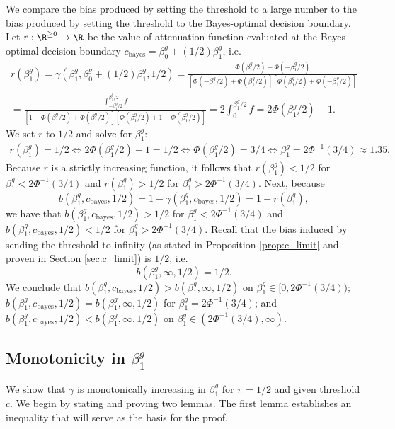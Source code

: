 \documentclass[11pt]{article}
\begin{document}
\begin{appendices}
\begin{refsection}
We compare the bias produced by setting the threshold to a large number to the bias produced by setting the threshold to the Bayes-optimal decision boundary. Let $r: \R^{\geq 0} \to \R$ be the value of attenuation function evaluated at the Bayes-optimal decision boundary $c_\textrm{bayes} = \beta^g_0 + (1/2) \beta^g_1$, i.e.
\begin{multline*}
r(\beta^g_1) = \gamma(\beta^g_1, \beta^g_0 + (1/2)\beta^g_1, 1/2) = \frac{\Phi(\beta^g_1/2) - \Phi(-\beta^g_1/2)}{\left[\Phi(-\beta^g_1/2) + \Phi( \beta^g_1/2) \right] \left[\Phi(\beta^g_1/2) + \Phi( -\beta^g_1/2)\right]} \\ = \frac{\int_{-\beta^g_1/2}^{\beta^g_1/2} f}{\left[ 1 - \Phi(\beta^g_1/2) + \Phi(\beta^g_1/2) \right]\left[ \Phi(\beta^g_1/2) + 1 - \Phi(\beta^g_1/2) \right]} = 2 \int_{0}^{\beta^g_1/2} f = 2 \Phi(\beta^g_1/2) - 1.
\end{multline*}
We set $r$ to $1/2$ and solve for $\beta^g_1$:
\begin{multline*}
r(\beta^g_1) = 1/2 \iff 2\Phi(\beta^g_1/2) -1 = 1/2 \iff \Phi(\beta^g_1/2) = 3/4 \iff \beta^g_1 = 2 \Phi^{-1}(3/4) \approx 1.35.
\end{multline*}
Because $r$ is a strictly increasing function, it follows that $r(\beta^g_1) < 1/2$ for $\beta^g_1 < 2\Phi^{-1}(3/4)$ and $r(\beta^g_1) > 1/2$ for $\beta^g_1 > 2\Phi^{-1}(3/4).$ Next, because $$b(\beta^g_1, c_\textrm{bayes}, 1/2) = 1 - \gamma(\beta^g_1, c_\textrm{bayes}, 1/2) = 1 - r(\beta^g_1),$$ we have that $b(\beta^g_1, c_\textrm{bayes}, 1/2) > 1/2$ for $\beta^g_1 < 2 \Phi^{-1}(3/4)$ and $b(\beta^g_1, c_\textrm{bayes}, 1/2) < 1/2$ for $\beta^g_1 > 2 \Phi^{-1}(3/4)$. Recall that the bias induced by sending the threshold to infinity (as stated in Proposition \ref{prop:c_limit} and proven in Section \ref{sec:c_limit}) is $1/2$, i.e. $$b(\beta^g_1, \infty, 1/2) = 1/2.$$ We conclude that $b(\beta^g_1, c_\textrm{bayes},1/2) > b(\beta^g_1, \infty, 1/2)$ on $\beta^g_1 \in [0, 2\Phi^{-1}(3/4))$; $b(\beta^g_1, c_\textrm{bayes},1/2) = b(\beta^g_1, \infty, 1/2)$ for $\beta^g_1 = 2\Phi^{-1}(3/4)$; and $b(\beta^g_1, c_\textrm{bayes},1/2) < b(\beta^g_1, \infty, 1/2)$ on $\beta^g_1 \in (2\Phi^{-1}(3/4), \infty)$.

\subsection{Monotonicity in $\beta^g_1$}\label{sec:monotone}
We show that $\gamma$ is monotonically increasing in $\beta^g_1$ for $\pi = 1/2$ and given threshold $c$. We begin by stating and proving two lemmas. The first lemma establishes an inequality that will serve as the basis for the proof.


\end{refsection}
\end{appendices}
\end{document}
